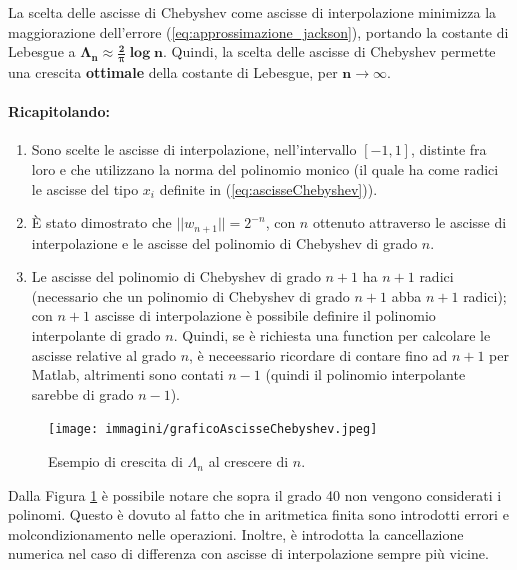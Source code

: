 \begin{remark}
	La scelta delle ascisse di Chebyshev come ascisse di interpolazione minimizza la maggiorazione dell'errore (\ref{eq:approssimazione_jackson}), portando la costante di Lebesgue a $\boldsymbol{\Lambda_n\approx\frac{2}{\pi}\log n}$. Quindi, la scelta delle ascisse di Chebyshev permette una crescita \textbf{ottimale} della costante di Lebesgue, per $\boldsymbol{n\rightarrow\infty}$.
\end{remark}

\paragraph{Ricapitolando:} 
\begin{enumerate}
	\item Sono scelte le ascisse di interpolazione, nell'intervallo $[-1,1]$, distinte fra loro e che utilizzano la norma del polinomio monico (il quale ha come radici le ascisse del tipo $x_i$ definite in (\ref{eq:ascisseChebyshev})). 
	
	\item È stato dimostrato che $||w_{n+1}||=2^{-n}$, con $n$ ottenuto attraverso le ascisse di interpolazione e le ascisse del polinomio di Chebyshev di grado $n$. 
	
	\item Le ascisse del polinomio di Chebyshev di grado $n+1$ ha $n+1$ radici (necessario che un polinomio di Chebyshev di grado $n+1$ abba $n+1$ radici); con $n+1$ ascisse di interpolazione è possibile definire il polinomio interpolante di grado $n$. Quindi, se è richiesta una function per calcolare le ascisse relative al grado $n$, è neceessario ricordare di contare fino ad $n+1$ per Matlab, altrimenti sono contati $n-1$ (quindi il polinomio interpolante sarebbe di grado $n-1$).
\end{enumerate}

\begin{figure}
    \centering
    \texttt{[image: immagini/graficoAscisseChebyshev.jpeg]}
    \caption{Esempio di crescita di $\Lambda_n$ al crescere di $n$.}\label{fig:graficoAscisseChebyshev}
\end{figure}

Dalla Figura \ref{fig:graficoAscisseChebyshev} è possibile notare che sopra il grado 40 non vengono considerati i polinomi. Questo è dovuto al fatto che in aritmetica finita sono introdotti errori e molcondizionamento nelle operazioni. Inoltre, è introdotta la cancellazione numerica nel caso di differenza con ascisse di interpolazione sempre più vicine.

